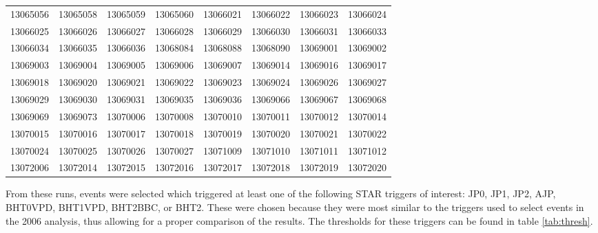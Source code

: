 \documentclass[letterpaper, abstract = on,listof=totoc, bibliography=totoc]{scrreprt}
\begin{document}
{\begin{longtable}{cccccccc}
13065056  &  13065058  &  13065059  &  13065060  &  13066021  &  13066022  &  13066023  &  13066024  \\ 
13066025  &  13066026  &  13066027  &  13066028  &  13066029  &  13066030  &  13066031  &  13066033  \\ 
13066034  &  13066035  &  13066036  &  13068084  &  13068088  &  13068090  &  13069001  &  13069002  \\ 
13069003  &  13069004  &  13069005  &  13069006  &  13069007  &  13069014  &  13069016  &  13069017  \\ 
13069018  &  13069020  &  13069021  &  13069022  &  13069023  &  13069024  &  13069026  &  13069027  \\ 
13069029  &  13069030  &  13069031  &  13069035  &  13069036  &  13069066  &  13069067  &  13069068  \\ 
13069069  &  13069073  &  13070006  &  13070008  &  13070010  &  13070011  &  13070012  &  13070014  \\ 
13070015  &  13070016  &  13070017  &  13070018  &  13070019  &  13070020  &  13070021  &  13070022  \\ 
13070024  &  13070025  &  13070026  &  13070027  &  13071009  &  13071010  &  13071011  &  13071012  \\ 
13072006  &  13072014  &  13072015  &  13072016  &  13072017  &  13072018  &  13072019  &  13072020  \\ \hline
\end{longtable}
} 
\normalsize

From these runs, events were selected which triggered at least one of the following STAR triggers of interest: JP0, JP1, JP2, AJP, BHT0VPD, BHT1VPD, BHT2BBC, or BHT2. These were chosen because they were most similar to the triggers used to select events in the 2006 analysis, thus allowing for a proper comparison of the results. The thresholds for these triggers can be found in table \ref{tab:thresh}.
\end{document}

